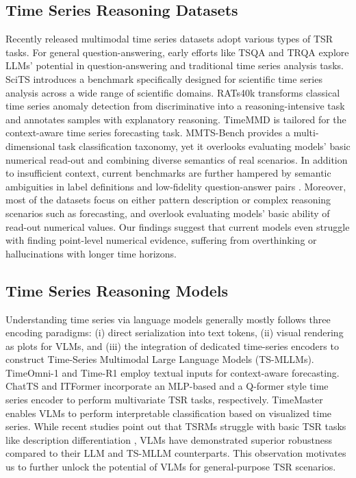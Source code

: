 \documentclass[11pt]{article}
\begin{document}
\subsection{Time Series Reasoning Datasets}
Recently released multimodal time series datasets adopt various types of TSR tasks. For general question-answering, early efforts like TSQA \cite{timemqa} and TRQA \cite{trqa} explore LLMs' potential in question-answering and traditional time series analysis tasks. SciTS \cite{scits} introduces a benchmark specifically designed for scientific time series analysis across a wide range of scientific domains. RATs40k \cite{timera} transforms classical time series anomaly detection from discriminative into a reasoning-intensive task and annotates samples with explanatory reasoning. TimeMMD \cite{timemmd}is tailored for the context-aware time series forecasting task. MMTS-Bench \cite{mmtsbench} provides a multi-dimensional task classification taxonomy, yet it overlooks evaluating models' basic numerical read-out and combining diverse semantics of real scenarios. In addition to insufficient context, current benchmarks are further hampered by semantic ambiguities in label definitions and low-fidelity question-answer pairs \cite{timeomni}. Moreover, most of the datasets focus on either pattern description or complex reasoning scenarios such as forecasting, and overlook evaluating models' basic ability of read-out numerical values. Our findings suggest that current models even struggle with finding point-level numerical evidence, suffering from overthinking or hallucinations with longer time horizons. 

\subsection{Time Series Reasoning Models}
Understanding time series via language models generally mostly follows three encoding paradigms: (i) direct serialization into text tokens, (ii) visual rendering as plots for VLMs, and (iii) the integration of dedicated time-series encoders to construct Time-Series Multimodal Large Language Models (TS-MLLMs). TimeOmni-1 \cite{timeomni} and Time-R1 \cite{timer1} employ textual inputs for context-aware forecasting. ChatTS \cite{chatts} and ITFormer \cite{itformer} incorporate an MLP-based and a Q-former \cite{blip} style time series encoder to perform multivariate TSR tasks, respectively. TimeMaster \cite{timemaster} enables VLMs to perform interpretable classification based on visualized time series. While recent studies point out that TSRMs struggle with basic TSR tasks like description differentiation \cite{bedtime}, VLMs have demonstrated superior robustness compared to their LLM and TS-MLLM counterparts. This observation motivates us to further unlock the potential of VLMs for general-purpose TSR scenarios.
\end{document}
